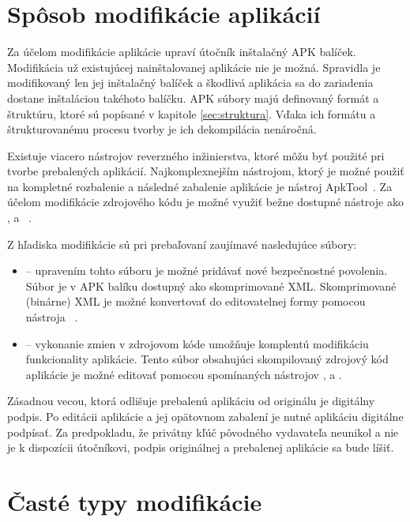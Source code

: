 \section{Spôsob modifikácie aplikácií}
Za účelom modifikácie aplikácie upraví útočník inštalačný APK balíček. Modifikácia už existujúcej nainštalovanej aplikácie nie je možná. Spravidla je modifikovaný len jej inštalačný balíček a škodlivá aplikácia sa do zariadenia dostane inštaláciou takéhoto balíčku.
APK súbory majú definovaný formát a štruktúru, ktoré sú popísané v kapitole \ref{sec:struktura}. Vďaka ich formátu a štrukturovanému procesu tvorby je ich dekompilácia nenáročná.

Existuje viacero nástrojov reverzného inžinierstva, ktoré môžu byť použité pri tvorbe prebalených aplikácií. Najkomplexnejším nástrojom, ktorý je možné použiť na kompletné rozbalenie a následné zabalenie aplikácie je nástroj ApkTool~\cite{Apktool}. Za účelom modifikácie zdrojového kódu je možné využiť bežne dostupné nástroje ako ,  a  ~\cite{Dex2jar, jdgui, smali}.

Z hľadiska modifikácie sú pri prebaľovaní zaujímavé nasledujúce súbory:

\begin{itemize}
	\item {} -- upravením tohto súboru je možné pridávať nové bezpečnostné povolenia. Súbor je v APK balíku dostupný ako skomprimované XML. Skomprimované (binárne) XML je možné konvertovať do editovatelnej formy pomocou nástroja ~\cite{Apktool}.
	\item {} -- vykonanie zmien v zdrojovom kóde umožňuje komplentú modifikáciu funkcionality aplikácie. Tento súbor obsahujúci skompilovaný zdrojový kód aplikácie je možné editovať pomocou spomínaných nástrojov ,  a .
\end{itemize}

Zásadnou vecou, ktorá odlišuje prebalenú aplikáciu od originálu je digitálny podpis. Po editácii aplikácie a jej opätovnom zabalení je nutné aplikáciu digitálne podpísať. Za predpokladu, že privátny kľúč pôvodného vydavateľa neunikol a nie je k dispozícii útočníkovi, podpis originálnej a prebalenej aplikácie sa bude líšiť. 

\section{Časté typy modifikácie}

